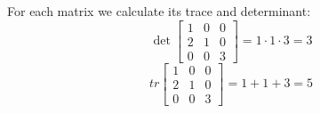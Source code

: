 For each matrix we calculate its trace and determinant:
\begin{equation*}
    \det{\begin{bmatrix}
        1 & 0 & 0 \\
        2 & 1 & 0 \\
        0 & 0 & 3 
    \end{bmatrix}} = 1 \cdot 1 \cdot 3 = 3
\end{equation*}
\begin{equation*}
    tr{\begin{bmatrix}
        1 & 0 & 0 \\
        2 & 1 & 0 \\
        0 & 0 & 3 
    \end{bmatrix}} = 1 + 1 + 3 = 5
\end{equation*}
